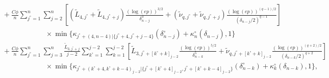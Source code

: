 \documentclass[aos]{imsart}
\begin{document}
\begin{appendix}
\begin{equation*}
\begin{aligned}
    & \quad + \frac{C \phi}{n} \sum_{j^\circ=1}^n \sum_{j=2}^{n} \left[ 
        (\tilde{L}_{4,j^\circ} + \tilde{L}_{4,j^\circ+j}) \frac{(\log(ep))^{3/2}}{\delta_{n-j}^3}
        + (\tilde\nu_{q,j^\circ} + \tilde\nu_{q,j^\circ+j}) \frac{{(\log(ep))}^{(q-1)/2}}{(\delta_{n-j}/2)^{q-1}}
    \right] \\
    & \quad \hspace{1in} \times \min\{\kappa_{j^\circ+(4,n-4)|\{j^\circ+4,j^\circ+j-4\}}(\delta_{n-j}^\circ) + \kappa^\circ_n(\delta_{n-j}), 1\} \\
    & \quad + \frac{C \phi}{n} \sum_{j^\circ=1}^n \sum_{j=3}^{n} 
    \frac{\tilde{L}_{3,j^\circ+j}}{j-2} \sum_{k^\circ=1}^{j-2} \sum_{k=1}^{j-2} \left[ 
        \tilde{L}_{3,j^\circ+[k^\circ+k]_{j-2}} \frac{(\log(ep))^{5/2}}{\delta_{n-k}^5}
        + \tilde\nu_{q,j^\circ+[k^\circ+k]_{j-2}} \frac{{(\log(ep))}^{(q+2)/2}}{(\delta_{n-k}/2)^{q+2}}
    \right] \\
    & \quad \hspace{1in} \times \min\{\kappa_{j^\circ + (k^\circ+4,k^\circ+k-4)_{j-2}|\{j^\circ + [k^\circ+4]_{j-2},j^\circ + [k^\circ+k-4]_{j-2}\}}(\delta_{n-k}^\circ) + \kappa^\circ_{k}(\delta_{n-k}), 1\}, \\
\end{aligned}
\end{equation*}

\end{appendix}
\end{document}
